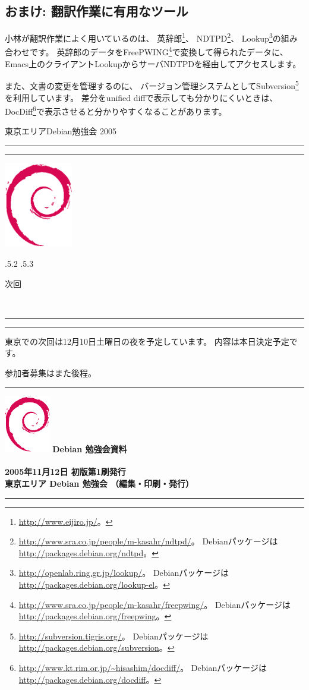 \documentclass[mingoth,a4paper]{jsarticle}
\makeatletter
\renewcommand{\section}{\@startsection{section}{1}{\z@}%
    {\Cvs \@plus.5\Cdp \@minus.2\Cdp}%
    {.5\Cvs \@plus.3\Cdp}%
    {\normalfont\Large\headfont\raggedright\centering}} %
\newcommand{\dancersection}[2]{%
\newpage
東京エリアDebian勉強会 2005
\hrule
\vspace{0.5mm}
\hrule
\hfill{}\includegraphics[width=3cm]{image200502/openlogo-nd.eps}\\
\vspace{-4cm}
\begin{center}
  \section{#1}
\end{center}
\hfill{}#2\hspace{3cm}\space\\
\hrule
\hrule
\vspace{1cm}
}
\makeatother
\begin{document}
\subsection{おまけ: 翻訳作業に有用なツール}

小林が翻訳作業によく用いているのは、
英辞郎\footnote{\url{http://www.eijiro.jp/}。}、
NDTPD\footnote{\url{http://www.sra.co.jp/people/m-kasahr/ndtpd/}。
Debianパッケージは\url{http://packages.debian.org/ndtpd}。}、
Lookup\footnote{\url{http://openlab.ring.gr.jp/lookup/}。
Debianパッケージは\url{http://packages.debian.org/lookup-el}。}の組み合わせです。
英辞郎のデータをFreePWING\footnote{\url{http://www.sra.co.jp/people/m-kasahr/freepwing/}。
Debianパッケージは\url{http://packages.debian.org/freepwing}。}で変換して得られたデータに、
Emacs上のクライアントLookupからサーバNDTPDを経由してアクセスします。

また、文書の変更を管理するのに、
バージョン管理システムとしてSubversion\footnote{\url{http://subversion.tigris.org/}。
Debianパッケージは\url{http://packages.debian.org/subversion}。}を利用しています。
差分をunified diffで表示しても分かりにくいときは、
DocDiff\footnote{\url{http://www.kt.rim.or.jp/~hisashim/docdiff/}。
Debianパッケージは\url{http://packages.debian.org/docdiff}。}で表示させると分かりやすくなることがあります。


\newpage 

\dancersection{次回}{}

東京での次回は12月10日土曜日の夜を予定しています。
内容は本日決定予定です。

参加者募集はまた後程。

\newpage

\vspace*{15cm}
\hrule
\vspace{2mm}
\includegraphics[width=2cm]{image200502/openlogo-nd.eps}
\noindent \Large \bf Debian 勉強会資料\\ \\
\noindent \normalfont 2005年11月12日 \hspace{5mm}  初版第1刷発行\\
\noindent \normalfont 東京エリア Debian 勉強会 （編集・印刷・発行）\\
\hrule
\end{document}
